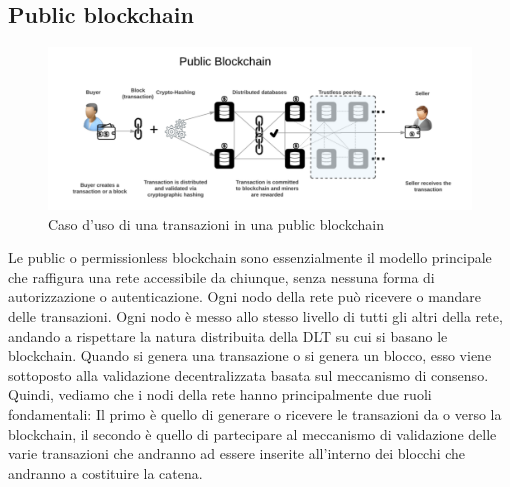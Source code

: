 \subsection{Public blockchain}
\begin{figure}[h]
    \centering
    \includegraphics[width=1\textwidth]{img/public-blockchain.png}
    \caption{Caso d'uso di una transazioni in una public blockchain}
    \label{fig:public-blockchain}
\end{figure}
Le public o permissionless blockchain sono essenzialmente il modello principale che raffigura una rete accessibile da chiunque, senza nessuna forma di autorizzazione o autenticazione. Ogni nodo della rete può ricevere o mandare delle transazioni. Ogni nodo è messo allo stesso livello di tutti gli altri della rete, andando a rispettare la natura distribuita della DLT su cui si basano le blockchain. Quando si genera una transazione o si genera un blocco, esso viene sottoposto alla validazione decentralizzata basata sul meccanismo di consenso. Quindi, vediamo che i nodi della rete hanno principalmente due ruoli fondamentali: Il primo è quello di generare o ricevere le transazioni da o verso la blockchain, il secondo è quello di partecipare al meccanismo di validazione delle varie transazioni che andranno ad essere inserite all'interno dei blocchi che andranno a costituire la catena. 
